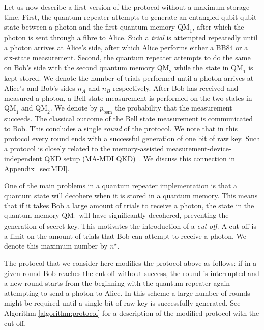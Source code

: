 \documentclass[aps,pra,reprint,superscriptaddress]{revtex4-1}
\newcommand{\nstar}{n^{\star}}
\begin{document}
Let us now describe a first version of the protocol without a maximum storage time. First, the quantum repeater attempts to generate an entangled qubit-qubit state between a photon and the first quantum memory $\textrm{QM}_1$, after which the photon is sent through a fibre to Alice. Such a \emph{trial} is attempted repeatedly until a photon arrives at Alice's side, after which Alice performs either a BB84 or a six-state measurement.
Second, the quantum repeater attempts to do the same on Bob's side with the second quantum memory $\textrm{QM}_2$ while the state in $\textrm{QM}_1$ is kept stored.
We denote the number of trials performed until a photon arrives at Alice's and Bob's sides $n_A$ and $n_B$ respectively. 
After Bob has received and measured a photon, a Bell state measurement is performed on the two states in $\textrm{QM}_1$ and $\textrm{QM}_2$. We denote by $p_\text{bsm}$ the probability that the measurement succeeds. The classical outcome of the Bell state measurement is communicated to Bob.
This concludes a single \emph{round} of the protocol. We note that in this protocol every round ends with a successful generation of one bit of raw key. 
Such a protocol is closely related to the memory-assisted measurement-device-independent QKD setup (MA-MDI QKD)~\cite{panayi2014memory}. We discuss this connection in Appendix~\ref{sec:MDI}.


One of the main problems in a quantum repeater implementation is that a quantum state will decohere when it is stored in a quantum memory. This means that if it takes Bob a large amount of trials to receive a photon, the state in the quantum memory $\textrm{QM}_1$ will have significantly decohered, preventing the generation of secret key. This motivates the introduction of a \emph{cut-off}. A cut-off is a limit on the amount of trials that Bob can attempt to receive a photon. We denote this maximum number by $\nstar$.

The protocol that we consider here modifies the protocol above as follows: if in a given round Bob reaches the cut-off without success, the round is interrupted and a new round starts from the beginning with the quantum repeater again attempting to send a photon to Alice. In this scheme a large number of rounds might be required until a single bit of raw key is successfully generated.
See Algorithm \ref{algorithm:protocol} for a description of the modified protocol with the cut-off.
\end{document}
